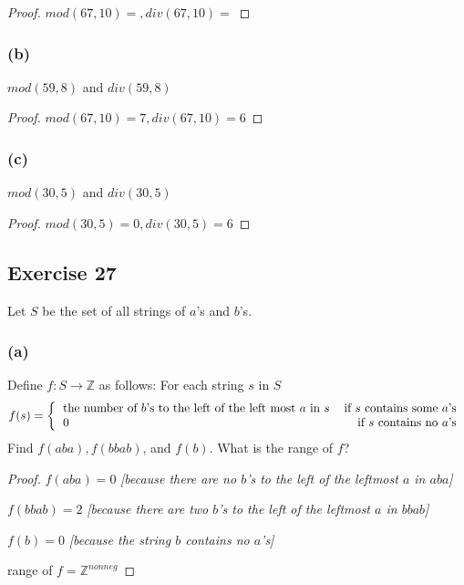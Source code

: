 \documentclass[14pt]{extarticle}
\newcommand{\Z}{\mathbb{Z}}
\begin{document}
\begin{proof}
    \(mod(67, 10) = , div(67, 10) = \)
\end{proof}

\subsubsection{(b)}
$mod(59, 8)$ and $div(59, 8)$

\begin{proof}
    \(mod(67, 10) = 7, div(67, 10) = 6\)
\end{proof}

\subsubsection{(c)}
$mod(30, 5)$ and $div(30, 5)$

\begin{proof}
    \(mod(30, 5) = 0, div(30, 5) = 6\)
\end{proof}

\subsection{Exercise 27}
Let $S$ be the set of all strings of $a$’s and $b$’s.

\subsubsection{(a)}
Define \(f: S \to \Z\) as follows: For each string $s$ in $S$
\[
    f(s) =
    \left\{
    \begin{tabular}{lr}
        the number of $b$'s to the left of the left most $a$ in $s$ & if $s$ contains some $a$'s \\
        0                                                           & if $s$ contains no $a$'s
    \end{tabular}
    \right.
\]
Find \(f(aba), f(bbab)\), and \(f(b)\). What is the range of $f$?

\begin{proof}
    \(f(aba) = 0\) {\it [because there are no $b$'s to the left
                of the leftmost $a$ in $aba$]}

    \(f(bbab) = 2\) {\it [because there are two $b$'s to the left of the leftmost $a$ in $bbab$]}

    \(f(b) = 0\) {\it [because the string $b$ contains no $a$'s]}

    range of \(f = \Z^{nonneg}\)
\end{proof}
\end{document}
